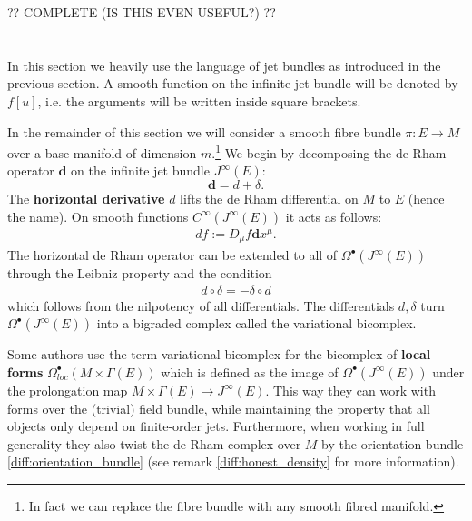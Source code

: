 
    ?? COMPLETE (IS THIS EVEN USEFUL?) ??

\section{}

    In this section we heavily use the language of jet bundles as introduced in the previous section. A smooth function on the infinite jet bundle will be denoted by $f[u]$, i.e. the arguments will be written inside square brackets.

    In the remainder of this section we will consider a smooth fibre bundle $\pi:E\rightarrow M$ over a base manifold of dimension $m$.\footnote{In fact we can replace the fibre bundle with any smooth fibred manifold.} We begin by decomposing the de Rham operator $\mathbf{d}$ on the infinite jet bundle $J^\infty(E)$: \[\mathbf{d} = d+\delta.\] The \textbf{horizontal derivative} $d$ lifts the de Rham differential on $M$ to $E$ (hence the name). On smooth functions $C^\infty(J^\infty(E))$ it acts as follows:
    \begin{gather}
        df := D_\mu f\mathbf{d}x^\mu.
    \end{gather}
    The horizontal de Rham operator can be extended to all of $\Omega^\bullet(J^\infty(E))$ through the Leibniz property and the condition
    \begin{gather}
        d\circ\delta = -\delta\circ d
    \end{gather}
    which follows from the nilpotency of all differentials. The differentials $d,\delta$ turn $\Omega^\bullet(J^\infty(E))$ into a bigraded complex called the variational bicomplex.
    \begin{remark}
        Some authors use the term variational bicomplex for the bicomplex of \textbf{local forms} $\Omega^\bullet_{loc}(M\times\Gamma(E))$ which is defined as the image of $\Omega^\bullet(J^\infty(E))$ under the prolongation map $M\times\Gamma(E)\rightarrow J^\infty(E)$. This way they can work with forms over the (trivial) field bundle, while maintaining the property that all objects only depend on finite-order jets. Furthermore, when working in full generality they also twist the de Rham complex over $M$ by the orientation bundle \ref{diff:orientation_bundle} (see remark \ref{diff:honest_density} for more information).
    \end{remark}

